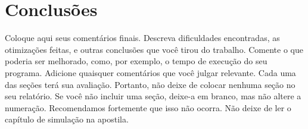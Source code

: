 \chapter{Conclusões}
Coloque aqui seus comentários finais.
Descreva dificuldades encontradas, as otimizações feitas, e outras conclusões que você
tirou do trabalho. Comente o que poderia ser melhorado, como, por exemplo, o tempo de
execução do seu programa. Adicione quaisquer comentários que você julgar relevante.
Cada uma das seções terá sua avaliação. Portanto, não deixe de colocar nenhuma seção no
seu relatório. Se você não incluir uma seção, deixe-a em branco, mas não altere a
numeração. Recomendamos fortemente que isso não ocorra. Não deixe de ler o capítulo de
simulação na apostila.
